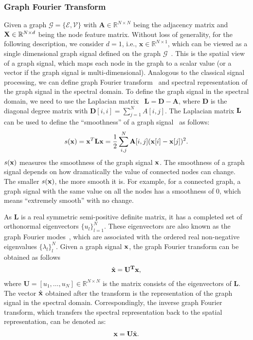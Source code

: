\documentclass[sigconf]{acmart}
\begin{document}
\subsubsection{Graph Fourier Transform}\label{sec:fourier}
Given a graph $\mathcal{G} = \{\mathcal{E},\mathcal{V}\}$ with $\mathbf{A}\in \mathbb{R}^{N\times N}$ being the adjacency matrix and ${\bf X}\in \mathbb{R}^{N\times d}$ being the node feature matrix. Without loss of generality, for the following description, we consider $d=1$, i.e., $\mathbf{x} \in \mathbb{R}^{N\times 1}$, which can be viewed as a single dimensional graph signal defined on the graph $\mathcal{G}$~\cite{sandryhaila2013discrete}. This is the spatial view of a graph signal, which maps each node in the graph to a scalar value (or a vector if the graph signal is multi-dimensional). Analogous to the classical signal processing, we can define graph Fourier transform~\cite{shuman2013emerging} and spectral representation of the graph signal in the spectral domain. To define the graph signal in the spectral domain, we need to use the Laplacian matrix~\cite{chung1997spectral} $\mathbf{L} = \mathbf{D} - \mathbf{A}$, where $\mathbf{D}$ is the diagonal degree matrix with $\mathbf{D}[i,i] = \sum\limits_{j=1}^N A[i,j]$. The Laplacian matrix ${\bf L}$ can be used to define the ``smoothness'' of a graph signal~\cite{shuman2013emerging} as follows:
\begin{align}
    s({\bf x}) =  {\bf x}^T {\bf L} {\bf x} = \frac{1}{2} \sum\limits_{i,j}^{N} {\bf A}[i,j] ({\bf x}[i]- {\bf x}[j])^2.
\end{align}
$s({\bf x})$ measures the smoothness of the graph signal ${\bf x}$. The smoothness of a graph signal depends on how dramatically the value of connected nodes can change. The smaller $s({\bf x})$, the more smooth it is. For example, for a connected graph, a graph signal with the same value on all the nodes has a smoothness of $0$, which means ``extremely smooth'' with no change. 

As $\mathbf{L}$ is a real symmetric semi-positive definite matrix, it has a completed set of orthonormal eigenvectors $\{u_l\}_{l=1}^{N}$. These eigenvectors are also known as the graph Fourier modes~\cite{shuman2013emerging}, which are associated with the ordered real non-negative eigenvalues $\{\lambda_l\}_{l}^{N}$. Given a graph signal ${\bf x}$, the graph Fourier transform can be obtained as follows
\begin{align}
    \hat{\bf x} = \mathbf{U^T x},
\end{align}
where $\mathbf{U}=[u_1,\dots, u_{N}] \in \mathbb{R}^{N\times N}$ is the matrix consists of the eigenvectors of $\mathbf{L}$. The vector $\hat{\bf x}$ obtained after the transform is the representation of the graph signal in the spectral domain. Correspondingly, the inverse graph Fourier transform, which transfers the spectral representation back to the spatial representation, can be denoted as: 
\begin{align} \label{eq:rec}
    \mathbf{x} = \mathbf{U}\hat{\bf x}.
\end{align}
\end{document}
